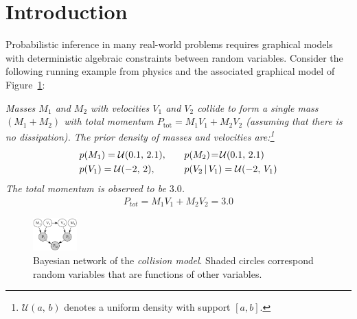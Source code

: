 \section{Introduction}
\label{sect:intro}

\noindent
Probabilistic inference in many real-world problems requires
graphical models with deterministic algebraic constraints
between random variables. Consider the following
running example from physics and the associated graphical
model of Figure~\ref{fig:collision.bn}:

\emph{
Masses $M_1$ and $M_2$ with velocities $V_1$ and $V_2$ collide to form a single mass $(M_1 + M_2)$ with total momentum 
$P_\text{tot} = M_1 V_1 + M_2 V_2$ (assuming that there is no dissipation).
The prior density of masses and velocities are:\footnote{
$\mathcal{U}(a, \, b)$ denotes a uniform density with support $[a,b]$.}
\begin{align}
&p(M_1) = \mathcal{U}(0.1, \, 2.1), \quad 
&&p(M_2) \!=\! \mathcal{U}(0.1, \, 2.1) \label{sym:u12}\\
&p(V_1) = \mathcal{U}(-2, \, 2), \quad
&&p(V_2 \, | \, V_1) = \mathcal{U}(-2, \, V_1) \label{sym:u34}
\end{align}
The total momentum is observed to be $3.0$.
\begin{align}\label{f:p_tot}
P_{tot} = M_1 V_1 + M_2 V_2 = 3.0
\end{align}
}%

\begin{figure}
\center
\includegraphics[width=0.15\textwidth]{../Figs/little-momentum1.pdf} 
\vspace{-2mm}
\caption{\footnotesize Bayesian network of the \emph{collision model}. Shaded circles correspond random variables that are functions of other variables.}
\label{fig:collision.bn}
\vspace{-5mm}
\end{figure}



 

